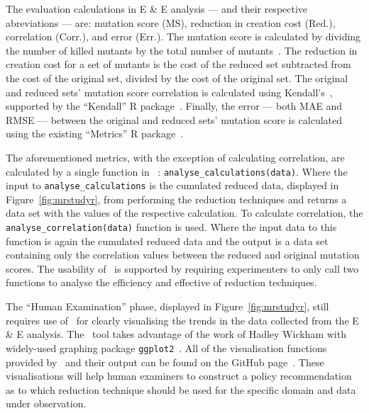 The evaluation calculations in E \& E analysis --- and their respective abreviations --- are: mutation score
(MS), reduction in creation cost (Red.), correlation (Corr.), and error (Err.). The mutation score is calculated
by dividing the number of killed mutants by the total number of mutants~\cite{wong1995reducing}. The reduction
in creation cost for a set of mutants is the cost of the reduced set subtracted from the cost of the original set,
divided by the cost of the original set. The original and reduced sets' mutation score correlation is calculated
using Kendall's~\taub, supported by the ``Kendall'' R package~\cite{mcleod2015kendall}. Finally, the error --- both
MAE and RMSE --- between the original and reduced sets' mutation score is calculated using the existing ``Metrics''
R package~\cite{metrics}.

The aforementioned metrics, with the exception of calculating correlation, are calculated by a single function
in \mr~: \texttt{analyse\_calculations(data)}. Where the input to \texttt{analyse\_calculations} is the cumulated
reduced data, displayed in Figure~\ref{fig:mrstudyr}, from performing the reduction techniques and returns a data
set with the values of the respective calculation. To calculate correlation, the \texttt{analyse\_correlation(data)}
function is used. Where the input data to this function is again the cumulated reduced data and the output is a
data set containing only the correlation values between the reduced and original mutation scores. The usability of
\mr~is supported by requiring experimenters to only call two functions to analyse the efficiency and effective of
reduction techniques.


The ``Human Examination'' phase, displayed in Figure~\ref{fig:mrstudyr}, still requires use of \mr~for clearly
visualising the trends in the data collected from the E \& E analysis. The \mr~tool takes advantage of the work
of Hadley Wickham with widely-used graphing package \texttt{ggplot2}~\cite{ggplot2}. All of the visualisation
functions provided by \mr~and their output can be found on the GitHub page~\cite{tool}. These visualisations
will help human examiners to construct a policy recommendation as to which reduction technique should be used
for the specific domain and data under observation.
